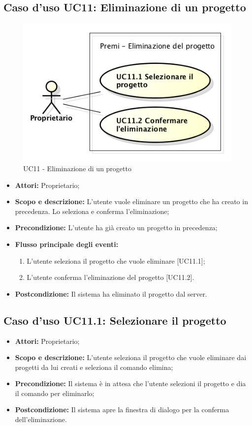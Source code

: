 \subsection{Caso d'uso UC11: Eliminazione di un progetto}
\begin{figure}[h] 
	\centering 
	\includegraphics[scale=0.45] {img/UC11.png} 
	\caption{UC11 - Eliminazione di un progetto} 
\end{figure}

\begin{itemize}
	\item \textbf{Attori:} Proprietario;
	\item \textbf{Scopo e descrizione:} L'utente vuole eliminare un progetto che ha creato in precedenza. Lo seleziona e conferma l'eliminazione;
	\item \textbf{Precondizione:} L'utente ha già creato un progetto in precedenza;
	\item \textbf{Flusso principale degli eventi:}
	\begin{enumerate}
		\item L'utente seleziona il progetto che vuole eliminare [UC11.1];
		\item L'utente conferma l'eliminazione del progetto [UC11.2].
	\end{enumerate}
	\item \textbf{Postcondizione:} Il sistema ha eliminato il progetto dal server.
\end{itemize}


\subsection{Caso d'uso UC11.1: Selezionare il progetto}
\begin{itemize}
	\item \textbf{Attori:} Proprietario;
	\item \textbf{Scopo e descrizione:} L'utente seleziona il progetto che vuole eliminare dai progetti da lui creati e seleziona il comando elimina;
	\item \textbf{Precondizione:} Il sistema è in attesa che l'utente selezioni il progetto e dia il comando per eliminarlo;
	\item \textbf{Postcondizione:} Il sistema apre la finestra di dialogo per la conferma dell'eliminazione.
\end{itemize}


